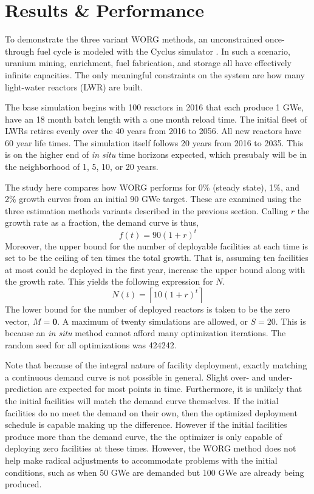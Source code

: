 \section{Results \& Performance}
\label{results}

To demonstrate the three variant WORG methods, an unconstrained 
once-through fuel cycle is modeled with the Cyclus simulator 
\cite{DBLP:journals/corr/HuffGCFMOSSW15}. In such a scenario, uranium
mining, enrichment, fuel fabrication, and storage all have effectively 
infinite capacities. The only meaningful constraints on the system are
how many light-water reactors (LWR) are built.

The base simulation begins with 100 reactors in 2016 that each produce
1 GWe, have an 18 month batch length with a one month reload time.
The initial fleet of LWRs retires evenly over the 40 years from 2016 to 
2056. All new reactors have 60 year life times.  The simulation itself 
follows 20 years from 2016 to 2035. This is on the higher end of 
\emph{in situ} time horizons expected, which presubaly 
will be in the neighborhood of 1, 5, 10, or 20 years.

The study here compares how WORG performs for 0\% (steady state), 1\%, 
and 2\% growth curves from an initial 90 GWe target. These are examined
using the three estimation methods variants described in the previous section.
Calling $r$ the growth rate as a 
fraction, the demand curve is thus,
\begin{equation}
\label{f-rate}
f(t) = 90 (1 + r)^t
\end{equation}
Moreover, the upper bound for the number of deployable facilities at 
each time is set to be the ceiling of ten times the total growth. 
That is, assuming ten facilities at most could be deployed in the first
year, increase the upper bound along with the growth rate.  This yields
the following expression for $N$.
\begin{equation}
\label{n-rate}
N(t) = \left\lceil 10 (1 + r)^t\right\rceil
\end{equation}
The lower bound for the number of deployed reactors is taken to be the 
zero vector, $M = \mathbf{0}$.  A maximum of twenty simulations are allowed, 
or $S = 20$.
This is because an \emph{in situ} method cannot afford many optimization 
iterations. The random seed for all optimizations was 424242.

Note that because of the integral nature of facility deployment, 
exactly matching a continuous demand curve is not possible in general. 
Slight over- and under-prediction are expected for most points in time. 
Furthermore, 
it is unlikely that the initial facilities will match the demand curve 
themselves. If the initial facilities do no meet the demand on their own, 
then the optimized deployment schedule is capable making up the difference.
However if the initial facilities produce more than the demand curve, 
the the optimizer is only capable of deploying zero facilities at these
times. However, the WORG method does not help make radical adjustments to 
accommodate 
problems with the initial conditions, such as when 50 GWe are demanded 
but 100 GWe are already being produced.

